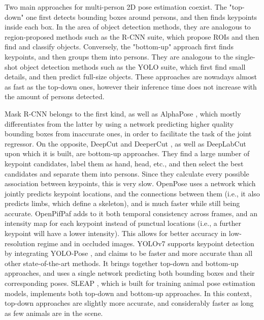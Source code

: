 Two main approaches for multi-person 2D pose estimation coexist. The "top-down" one first detects bounding boxes around persons, and then finds keypoints inside each box. In the area of object detection methods, they are analogous to region-proposed methods such as the R-CNN suite, which propose ROIs and then find and classify objects. Conversely, the "bottom-up" approach first finds keypoints, and then groups them into persons. They are analogous to the single-shot object detection methods such as the YOLO suite, which first find small details, and then predict full-size objects. These approaches are nowadays almost as fast as the top-down ones, however their inference time does not increase with the amount of persons detected. 

Mask R-CNN belongs to the first kind, as well as AlphaPose \cite{Fang2017}, which mostly differentiates from the latter by using a network predicting higher quality bounding boxes from inaccurate ones, in order to facilitate the task of the joint regressor. On the opposite, DeepCut and DeeperCut \cite{Pishchulin2016,Insafutdinov2016}, as well as DeepLabCut \cite{Mathis2018,Lauer2022} upon which it is built, are bottom-up approaches. They find a large number of keypoint candidates, label them as hand, head, etc., and then select the best candidates and separate them into persons. Since they calculate every possible association between keypoints, this is very slow. OpenPose \cite{Cao2019} uses a network which jointly predicts keypoint locations, and the connections between them (i.e., it also predicts limbs, which define a skeleton), and is much faster while still being accurate. OpenPifPaf \cite{Kreiss2021} adds to it both temporal consistency across frames, and an intensity map for each keypoint instead of punctual locations (i.e., a further keypoint will have a lower intensity). This allows for better accuracy in low-resolution regime and in occluded images. YOLOv7 supports keypoint detection by integrating YOLO-Pose \cite{Maji2022}, and claims to be faster and more accurate than all other state-of-the-art methods. It brings together top-down and bottom-up approaches, and uses a single network predicting both bounding boxes and their corresponding poses. SLEAP \cite{Pereira2022}, which is built for training animal pose estimation models, implements both top-down and bottom-up approaches. In this context, top-down approaches are slightly more accurate, and considerably faster as long as few animals are in the scene.

